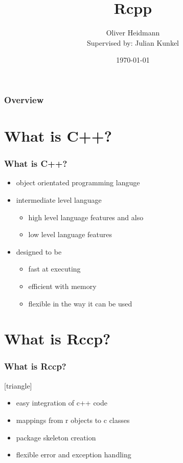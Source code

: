 \documentclass[hyperef={
    colorlinks=true,
    linkcolor=blue,
    filecolor=black,
urlcolor=blue}
]{beamer}
\title[Rcpp]{Rcpp} %
\author{Oliver Heidmann\\{\small Supervised by: Julian Kunkel}}
\institute[UNIHH] 
{
University of Hamburg  \\ %
\medskip
\textit{oliverheidmann@hotmail.de} %
\newline
}
\date{\today} %
\begin{document}
\begin{frame}
\titlepage %
\end{frame}

\begin{frame}
\frametitle{Overview} \tableofcontents 
\end{frame}

\section{What is C++?}
\begin{frame}
    \frametitle{What is C++?}
\begin{itemize}
    \item object orientated programming languge
    \item intermediate level language
        \begin{itemize}
            \item high level language features
            \newline and also 
            \item low level language features 
        \end{itemize}
    \item designed to be
        \begin{itemize}
            \item fast at executing 
            \item efficient with memory
            \item flexible in the way it can be used
        \end{itemize}
\end{itemize}
\end{frame}

\section{What is Rccp?}
\begin{frame}
    \frametitle{What is Rccp?}
[triangle]
\begin{itemize}
    \item easy integration of c++ code
    \item mappings from r objects to c classes 
    \item package skeleton creation
    \item flexible error and exception handling
\end{itemize}
\end{frame}
\end{document}
